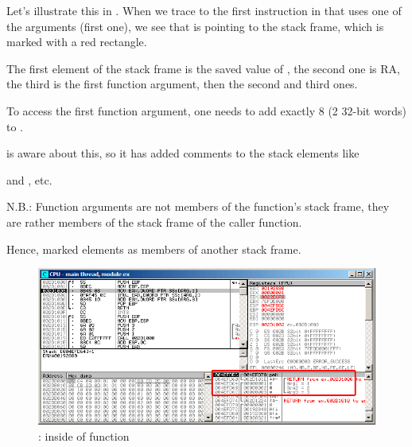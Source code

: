 \myindex{\olly}
Let's illustrate this in \olly.
When we trace to the first instruction in \ttf that uses one of the arguments 
(first one), we see that \EBP is pointing to the \gls{stack frame}, 
which is marked with a red rectangle.

The first element of the \gls{stack frame} is the saved value of \EBP, 
the second one is \ac{RA}, the third is the first function argument, then the second and third ones.

To access the first function argument, one needs to add exactly 8 (2 32-bit words) to \EBP.

\olly is aware about this, so it has added comments to the stack elements like

 and , etc.

N.B.: Function arguments are not members of the function's stack frame, they are rather
members of the stack frame of the \gls{caller} function.

Hence, \olly marked  elements as members of another stack frame.

\begin{figure}[H]
\centering
\includegraphics[scale=\FigScale]{patterns/05_passing_arguments/olly.png}
\caption{\olly: inside of \ttf{} function}
\label{fig:passing_arguments_olly}
\end{figure}

